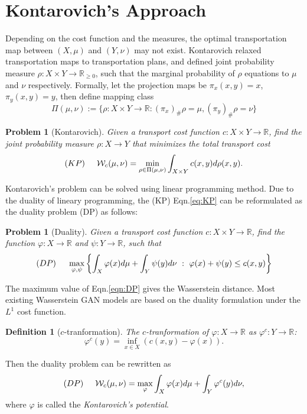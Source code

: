 \documentclass{article}
\newtheorem{definition}[theorem]{Definition}
\newtheorem{problem}[theorem]{Problem}
\begin{document}
\section{Kontarovich's Approach}\label{sec:Kontarovichmethod}
Depending on the cost function and the measures, the optimal transportation map between $(X,\mu)$ and $(Y,\nu)$ may not exist. Kontarovich relaxed transportation maps to transportation plans, and defined joint probability measure $\rho: X\times Y\to \mathbb{R}_{\ge 0}$, such that the marginal probability of $\rho$ equations to $\mu$ and $\nu$ respectively.
Formally, let the projection maps be $\pi_x(x,y)=x$, $\pi_y(x,y)=y$, then define mapping class
\begin{equation}
    \Pi(\mu,\nu):=\{\rho:X\times Y\to\mathbb{R}:  (\pi_x)_\#\rho=\mu, (\pi_y)_\#\rho=\nu \}
\end{equation}
\vspace{-8mm}
\begin{problem}[Kontarovich] Given a transport cost function $c: X\times Y\to \mathbb{R}$, find the joint probability measure $\rho:X\to Y$ that minimizes the total transport cost
\begin{equation}
(KP)\hspace{5mm}  \mathcal{W}_c(\mu,\nu) = \min_{\rho \in \Pi(\mu,\nu)} \int_{X\times Y} c(x,y) d\rho(x,y).
    \label{eq:KP}
\end{equation}
\end{problem}
Kontarovich's problem can be solved using linear programming method. Due to the duality of lineary programming, the (KP) Eqn.\ref{eq:KP} can be reformulated as the duality problem (DP) as follows:
\begin{problem}[Duality] Given a transport cost function $c: X\times Y\to \mathbb{R}$, find the function $\varphi:X\to \mathbb{R}$ and $\psi:Y\to \mathbb{R}$, such that
\begin{equation}
(DP)\hspace{5mm}  \max_{\varphi,\psi} \left\{\int_X \varphi(x) d\mu + \int_Y \psi(y) d\nu~:~ \varphi(x)+\psi(y)\le c(x,y) \right\}
    \label{eqn:DP}
\end{equation}
\end{problem}
The maximum value of Eqn.\ref{eqn:DP} gives the Wasserstein distance. Most existing Wasserstein GAN models are based on the duality formulation under the $L^1$ cost function.
\begin{definition}[$c$-tranformation]
The \emph{$c$-tranformation} of $\varphi:X\to\mathbb{R}$ as $\varphi^c:Y\to \mathbb{R}$:
\begin{equation}
    \varphi^c(y) = \inf_{x\in X}( c(x,y) - \varphi(x)).
\end{equation}
\end{definition}
Then the duality problem can be rewritten as
\begin{equation}
(DP)\hspace{5mm}  \mathcal{W}_c(\mu,\nu)=\max_\varphi
\int_X \varphi(x) d\mu + \int_Y \varphi^c(y) d\nu,
    \label{eqn:DP2}
\end{equation}
where $\varphi$ is called the \emph{Kontarovich's potential}.
\end{document}
